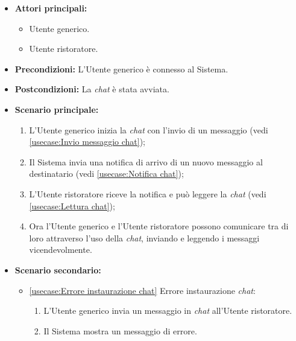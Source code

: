 \label{usecase:Chat Utente generico}
\begin{itemize}
	\item \textbf{Attori principali:} 
	\begin{itemize}
        \item Utente generico.
        \item Utente ristoratore.
    \end{itemize}

	\item \textbf{Precondizioni:} L'Utente generico è connesso al Sistema.


	\item \textbf{Postcondizioni:} La \textit{chat} è stata avviata.

	\item \textbf{Scenario principale:}
            \begin{enumerate}
                \item L'Utente generico inizia la \textit{chat} con l'invio di un messaggio (vedi \autoref{usecase:Invio messaggio chat});
                \item Il Sistema invia una notifica di arrivo di un nuovo messaggio al destinatario (vedi \autoref{usecase:Notifica chat});
                \item L'Utente ristoratore riceve la notifica e può leggere la \textit{chat} (vedi \autoref{usecase:Lettura chat});
                \item Ora l'Utente generico e l'Utente ristoratore possono comunicare tra di loro attraverso l'uso della \textit{chat}, inviando e leggendo i messaggi vicendevolmente.
	      \end{enumerate}

    \item \textbf{Scenario secondario:}
		  \begin{itemize}
			  \item \autoref{usecase:Errore instaurazione chat} Errore instaurazione \textit{chat}:
				\begin{enumerate}
					\item L'Utente generico invia un messaggio in \textit{chat} all'Utente ristoratore.
					\item Il Sistema mostra un messaggio di errore.
				\end{enumerate}
		  \end{itemize}
\end{itemize}